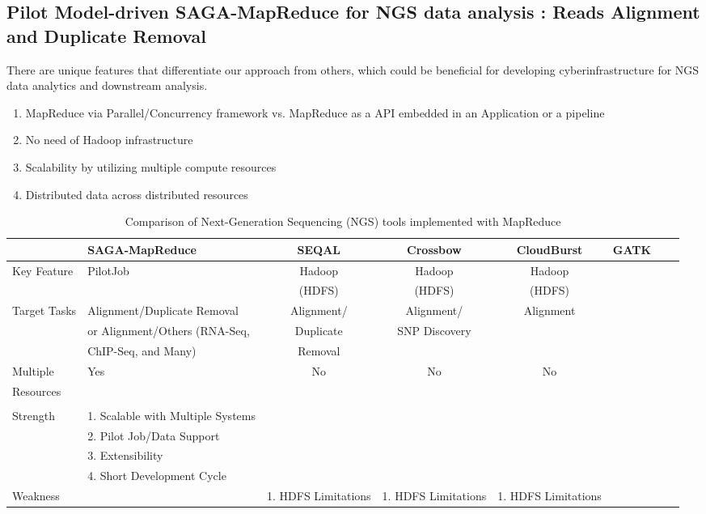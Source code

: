\documentclass{sig-alternate}
\begin{document}
\subsection{Pilot Model-driven SAGA-MapReduce for NGS data analysis : Reads Alignment and Duplicate Removal}

There are unique features that differentiate our approach from others, which could be beneficial for developing cyberinfrastructure for NGS data analytics and downstream analysis.  
\begin{enumerate}

\item MapReduce via Parallel/Concurrency framework vs. MapReduce as a API embedded in an Application or a pipeline  
\item No need of Hadoop infrastructure
\item Scalability by utilizing multiple compute resources
\item Distributed data across distributed resources
\end{enumerate}
 
 

\begin{center}
\begin{table}[ht]
{\small
\hfill{}
\begin{tabular}{|l|l|c|c|c|c|c|c|}
\hline
  & \textbf{SAGA-MapReduce}\cite{pj_sagamr} & \textbf{SEQAL}\cite{seal2011} & \textbf{Crossbow}\cite{langmead2009} & \textbf{CloudBurst}\cite{cloudburst} & \textbf{GATK}\cite{gatk} \\ \hline
 \hline 
 Key Feature & PilotJob   &  Hadoop  &  Hadoop & Hadoop & \\ 
  &   & (HDFS)  &  (HDFS) & (HDFS) & \\ \hline
Target Tasks & Alignment/Duplicate Removal & Alignment/ & Alignment/ & Alignment & \\
       &  or Alignment/Others (RNA-Seq, & Duplicate & SNP Discovery & & \\ 
        & ChIP-Seq, and Many) &  Removal & &  & \\ \hline  
Multiple  & Yes  & No  & No & No  &\\
Resources   & &  &   &  &\\  &  &  &  &  & \\ \hline

Strength & 1. Scalable with Multiple Systems  &  &  &  & \\ 

&  2. Pilot Job/Data Support & &  & & \\ 
&3. Extensibility  &  &  &  & \\
& 4. Short Development Cycle & & & & \\\hline
Weakness &  & 1. HDFS Limitations & 1. HDFS Limitations & 1. HDFS Limitations  &\\ \hline

\hline
\end{tabular}}
\hfill{}
\caption{Comparison of Next-Generation Sequencing (NGS) tools implemented with MapReduce}
 \label{table:mr-comparison}
\end{table}
\end{center}
\end{document}
